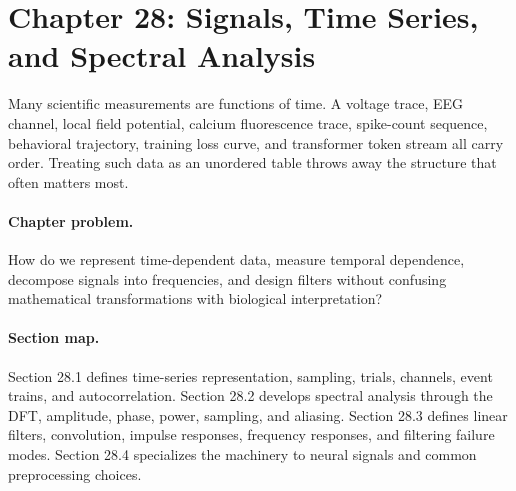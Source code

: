 \section{Chapter 28: Signals, Time Series, and Spectral Analysis}
\label{ch:signals-time-series-spectral-analysis}

Many scientific measurements are functions of time. A voltage trace, EEG channel, local field potential, calcium fluorescence trace, spike-count sequence, behavioral trajectory, training loss curve, and transformer token stream all carry order. Treating such data as an unordered table throws away the structure that often matters most.

\paragraph{Chapter problem.}
How do we represent time-dependent data, measure temporal dependence, decompose signals into frequencies, and design filters without confusing mathematical transformations with biological interpretation?

\paragraph{Section map.}
Section 28.1 defines time-series representation, sampling, trials, channels, event trains, and autocorrelation. Section 28.2 develops spectral analysis through the DFT, amplitude, phase, power, sampling, and aliasing. Section 28.3 defines linear filters, convolution, impulse responses, frequency responses, and filtering failure modes. Section 28.4 specializes the machinery to neural signals and common preprocessing choices.

